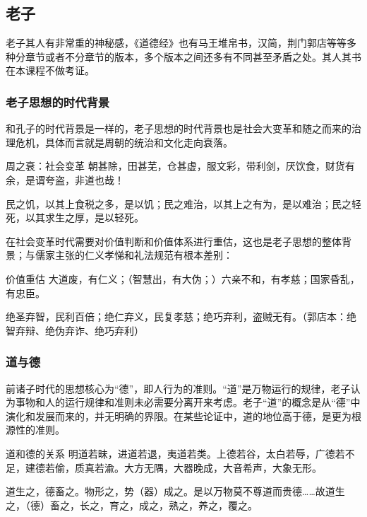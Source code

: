 \subsection{老子}

老子其人有非常重的神秘感，《道德经》也有马王堆帛书，汉简，荆门郭店等等多种分章节或者不分章节的版本，多个版本之间还多有不同甚至矛盾之处。其人其书在本课程不做考证。

\subsubsection{老子思想的时代背景}

和孔子的时代背景是一样的，老子思想的时代背景也是社会大变革和随之而来的治理危机，具体而言就是周朝的统治和文化走向衰落。

\begin{fancybox}{周之衰：社会变革}
    朝甚除，田甚芜，仓甚虚，服文彩，带利剑，厌饮食，财货有余，是谓夸盗，非道也哉！

    民之饥，以其上食税之多，是以饥；民之难治，以其上之有为，是以难治；民之轻死，以其求生之厚，是以轻死。
\end{fancybox}

在社会变革时代需要对价值判断和价值体系进行重估，这也是老子思想的整体背景；与儒家主张的仁义孝悌和礼法规范有根本差别：

\begin{fancybox}{价值重估}
    大道废，有仁义；（智慧出，有大伪；）六亲不和，有孝慈；国家昏乱，有忠臣。

    绝圣弃智，民利百倍；绝仁弃义，民复孝慈；绝巧弃利，盗贼无有。（郭店本：绝智弃辩、绝伪弃诈、绝巧弃利）
\end{fancybox}

\subsubsection{道与德}

前诸子时代的思想核心为“德”，即人行为的准则。“道”是万物运行的规律，老子认为事物和人的运行规律和准则未必需要分离开来考虑。老子“道”的概念是从“德”中演化和发展而来的，并无明确的界限。在某些论证中，道的地位高于德，是更为根源性的准则。

\begin{fancybox}{道和德的关系}
    明道若昧，进道若退，夷道若类。上德若谷，太白若辱，广德若不足，建德若偷，质真若渝。大方无隅，大器晚成，大音希声，大象无形。

    道生之，德畜之。物形之，势（器）成之。是以万物莫不尊道而贵德……故道生之，（德）畜之，长之，育之，成之，熟之，养之，覆之。
\end{fancybox}

